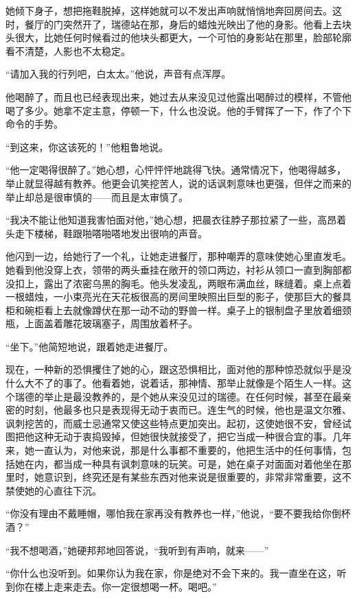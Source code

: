 \par 她倾下身子，想把拖鞋脱掉，这样她就可以不发出声响就悄悄地奔回房间去。这时，餐厅的门突然开了，瑞德站在那，身后的蜡烛光映出了他的身影。他看上去块头很大，比她任何时候看过的他块头都更大，一个可怕的身影站在那里，脸部轮廓看不清楚，人影也不太稳定。
\par “请加入我的行列吧，白太太。”他说，声音有点浑厚。
\par 他喝醉了，而且也已经表现出来，她过去从来没见过他露出喝醉过的模样，不管他喝了多少。她拿不定主意，停顿一下，什么也没说。他的手臂挥了一下，作了个下命令的手势。
\par “到这来，你这该死的！”他粗鲁地说。
\par “他一定喝得很醉了。”她心想，心怦怦怦地跳得飞快。通常情况下，他喝得越多，举止就显得越有教养。他更会讥笑挖苦人，说的话讽刺意味也更强，但伴之而来的举止却总是很审慎的——而且是太审慎了。
\par “我决不能让他知道我害怕面对他，”她心想，把晨衣往脖子那拉紧了一些，高昂着头走下楼梯，鞋跟啪嗒啪嗒地发出很响的声音。
\par 他闪到一边，给她行了一个礼，让她走进餐厅，那种嘲弄的意味使她心里直发毛。她看到他没穿上衣，领带的两头垂挂在敞开的领口两边，衬衫从领口一直到胸部都没扣上，露出了浓密乌黑的胸毛。他头发凌乱，两眼布满血丝，眯缝着。桌上点着一根蜡烛，一小束亮光在天花板很高的房间里映照出巨型的影子，使那巨大的餐具柜和碗柜看上去就像蹲伏在那一动不动的野兽一样。桌子上的银制盘子里放着细颈瓶，上面盖着雕花玻璃塞子，周围放着杯子。
\par “坐下。”他简短地说，跟着她走进餐厅。
\par 现在，一种新的恐惧攫住了她的心，跟这恐惧相比，面对他的那种惊恐就似乎是没什么大不了的事了。他看着她，说着话，那神情、那举止就像是个陌生人一样。这个瑞德的举止是最没教养的，是个她从来没见过的瑞德。在任何时候，甚至在最亲密的时刻，他最多也只是表现得无动于衷而已。连生气的时候，他也是温文尔雅、讽刺挖苦的，而威士忌通常又使这些特点更加突出。起初，这使她很不安，曾经试图把他这种无动于衷捣毁掉，但她很快就接受了，把它当成一种很合宜的事。几年来，她一直认为，对他来说，那是什么事都不重要的，他把生活中的任何事情，包括她在内，都当成一种具有讽刺意味的玩笑。可是，她在桌子对面面对着他坐在那里时，她意识到，终究还是有某些东西对他来说是很重要的，非常非常重要，这不禁使她的心直往下沉。
\par “你没有理由不戴睡帽，哪怕我在家再没有教养也一样，”他说，“要不要我给你倒杯酒？”
\par “我不想喝酒，”她硬邦邦地回答说，“我听到有声响，就来——”
\par “你什么也没听到。如果你认为我在家，你是绝对不会下来的。我一直坐在这，听到你在楼上走来走去。你一定很想喝一杯。喝吧。”

